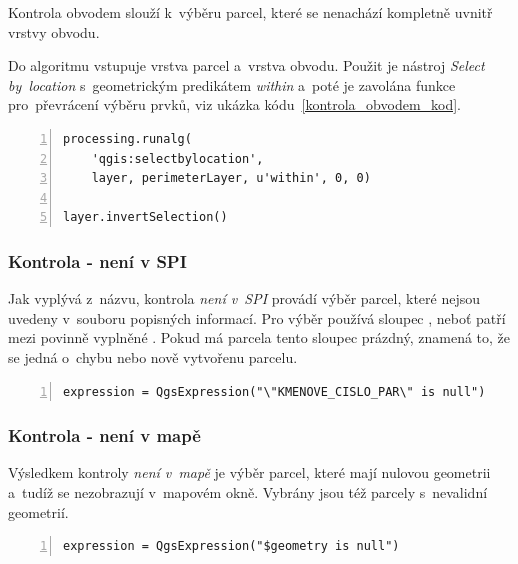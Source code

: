 Kontrola obvodem slouží k~výběru parcel, které se nenachází kompletně uvnitř vrstvy obvodu.

Do algoritmu vstupuje vrstva parcel a~vrstva obvodu. Použit je nástroj \textit{Select by~location} s~geometrickým predikátem \textit{within} a~poté je zavolána funkce pro~převrácení výběru prvků, viz ukázka kódu~\ref{kontrola_obvodem_kod}.

{\scriptsize
\begin{lstlisting}[style=python, caption={Kontrola \textit{obvodem} - výběr prvků}, captionpos=b, label=kontrola_obvodem_kod, backgroundcolor = \color{light-gray},  numbers=left]
processing.runalg(
    'qgis:selectbylocation',
    layer, perimeterLayer, u'within', 0, 0)

layer.invertSelection()
\end{lstlisting}}

\subsubsection{Kontrola - není v SPI}
\label{kontrola_neni_v_spi}

Jak vyplývá z~názvu, kontrola \textit{není v~SPI} provádí výběr parcel, které nejsou uvedeny v~souboru popisných informací. Pro výběr používá sloupec \texttt{}, neboť patří mezi povinně vyplněné \citep{struktura_vfk}. Pokud má parcela tento sloupec prázdný, znamená to, že se jedná o~chybu nebo nově vytvořenu parcelu.

{\scriptsize
\begin{lstlisting}[style=python, caption={Kontrola \textit{není v~SPI} - vzorec pro~výběr prvků}, captionpos=b, label=kontrola_spi_kod, backgroundcolor = \color{light-gray},  numbers=left]
expression = QgsExpression("\"KMENOVE_CISLO_PAR\" is null")
\end{lstlisting}}

\subsubsection{Kontrola - není v mapě}
\label{kontrola_neni_v_mape}

Výsledkem kontroly \textit{není v~mapě} je výběr parcel, které mají nulovou geometrii a~tudíž se nezobrazují v~mapovém okně. Vybrány jsou též parcely s~nevalidní geometrií.

{\scriptsize
\begin{lstlisting}[style=python, caption={Kontrola \textit{není v~mapě} - vzorec pro~výběr prvků}, captionpos=b, label=kontrola_mapa_kod, backgroundcolor = \color{light-gray},  numbers=left]
expression = QgsExpression("$geometry is null")
\end{lstlisting}}

